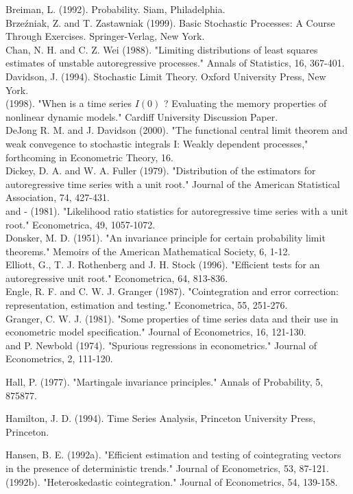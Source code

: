\documentclass[10pt]{article}
\begin{document}
Breiman, L. (1992). Probability. Siam, Philadelphia.\\
Brzeźniak, Z. and T. Zastawniak (1999). Basic Stochastic Processes: A Course Through Exercises. Springer-Verlag, New York.\\
Chan, N. H. and C. Z. Wei (1988). "Limiting distributions of least squares estimates of unstable autoregressive processes." Annals of Statistics, 16, 367-401.\\
Davidson, J. (1994). Stochastic Limit Theory. Oxford University Press, New York.\\
(1998). "When is a time series $I(0)$ ? Evaluating the memory properties of nonlinear dynamic models." Cardiff University Discussion Paper.\\
DeJong R. M. and J. Davidson (2000). "The functional central limit theorem and weak convegence to stochastic integrals I: Weakly dependent processes," forthcoming in Econometric Theory, 16.\\
Dickey, D. A. and W. A. Fuller (1979). "Distribution of the estimators for autoregressive time series with a unit root." Journal of the American Statistical Association, 74, 427-431.\\
and - (1981). "Likelihood ratio statistics for autoregressive time series with a unit root." Econometrica, 49, 1057-1072.\\
Donsker, M. D. (1951). "An invariance principle for certain probability limit theorems." Memoirs of the American Mathematical Society, 6, 1-12.\\
Elliott, G., T. J. Rothenberg and J. H. Stock (1996). "Efficient tests for an autoregressive unit root." Econometrica, 64, 813-836.\\
Engle, R. F. and C. W. J. Granger (1987). "Cointegration and error correction: representation, estimation and testing." Econometrica, 55, 251-276.\\
Granger, C. W. J. (1981). "Some properties of time series data and their use in econometric model specification." Journal of Econometrics, 16, 121-130.\\
and P. Newbold (1974). "Spurious regressions in econometrics." Journal of Econometrics, 2, 111-120.

Hall, P. (1977). "Martingale invariance principles." Annals of Probability, 5, 875877.

Hamilton, J. D. (1994). Time Series Analysis, Princeton University Press, Princeton.

Hansen, B. E. (1992a). "Efficient estimation and testing of cointegrating vectors in the presence of deterministic trends." Journal of Econometrics, 53, 87-121.\\
(1992b). "Heteroskedastic cointegration." Journal of Econometrics, 54, 139-158.
\end{document}
